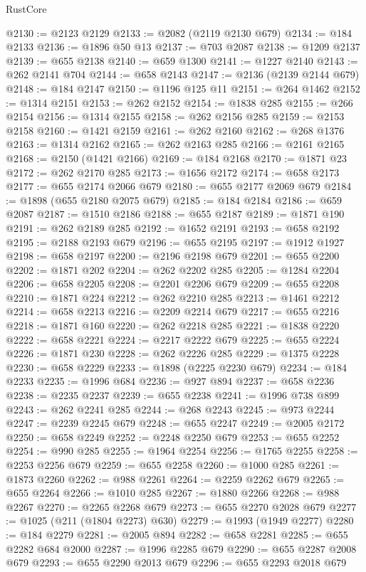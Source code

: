 \begin{lexlean}{RustCore}
\begin{coremodule}
@2130 := @2123 @2129
@2133 := @2082 (@2119 @2130 @679)
@2134 := @184 @2133
@2136 := @1896 @50 @13
@2137 := @703 @2087
@2138 := @1209 @2137
@2139 := @655 @2138
@2140 := @659 @1300
@2141 := @1227 @2140
@2143 := @262 @2141 @704
@2144 := @658 @2143
@2147 := @2136 (@2139 @2144 @679)
@2148 := @184 @2147
@2150 := @1196 @125 @11
@2151 := @264 @1462
@2152 := @1314 @2151
@2153 := @262 @2152
@2154 := @1838 @285
@2155 := @266 @2154
@2156 := @1314 @2155
@2158 := @262 @2156 @285
@2159 := @2153 @2158
@2160 := @1421 @2159
@2161 := @262 @2160
@2162 := @268 @1376
@2163 := @1314 @2162
@2165 := @262 @2163 @285
@2166 := @2161 @2165
@2168 := @2150 (@1421 @2166)
@2169 := @184 @2168
@2170 := @1871 @23
@2172 := @262 @2170 @285
@2173 := @1656 @2172
@2174 := @658 @2173
@2177 := @655 @2174 @2066 @679
@2180 := @655 @2177 @2069 @679
@2184 := @1898 (@655 @2180 @2075 @679)
@2185 := @184 @2184
@2186 := @659 @2087
@2187 := @1510 @2186
@2188 := @655 @2187
@2189 := @1871 @190
@2191 := @262 @2189 @285
@2192 := @1652 @2191
@2193 := @658 @2192
@2195 := @2188 @2193 @679
@2196 := @655 @2195
@2197 := @1912 @1927
@2198 := @658 @2197
@2200 := @2196 @2198 @679
@2201 := @655 @2200
@2202 := @1871 @202
@2204 := @262 @2202 @285
@2205 := @1284 @2204
@2206 := @658 @2205
@2208 := @2201 @2206 @679
@2209 := @655 @2208
@2210 := @1871 @224
@2212 := @262 @2210 @285
@2213 := @1461 @2212
@2214 := @658 @2213
@2216 := @2209 @2214 @679
@2217 := @655 @2216
@2218 := @1871 @160
@2220 := @262 @2218 @285
@2221 := @1838 @2220
@2222 := @658 @2221
@2224 := @2217 @2222 @679
@2225 := @655 @2224
@2226 := @1871 @230
@2228 := @262 @2226 @285
@2229 := @1375 @2228
@2230 := @658 @2229
@2233 := @1898 (@2225 @2230 @679)
@2234 := @184 @2233
@2235 := @1996 @684
@2236 := @927 @894
@2237 := @658 @2236
@2238 := @2235 @2237
@2239 := @655 @2238
@2241 := @1996 @738 @899
@2243 := @262 @2241 @285
@2244 := @268 @2243
@2245 := @973 @2244
@2247 := @2239 @2245 @679
@2248 := @655 @2247
@2249 := @2005 @2172
@2250 := @658 @2249
@2252 := @2248 @2250 @679
@2253 := @655 @2252
@2254 := @990 @285
@2255 := @1964 @2254
@2256 := @1765 @2255
@2258 := @2253 @2256 @679
@2259 := @655 @2258
@2260 := @1000 @285
@2261 := @1873 @2260
@2262 := @988 @2261
@2264 := @2259 @2262 @679
@2265 := @655 @2264
@2266 := @1010 @285
@2267 := @1880 @2266
@2268 := @988 @2267
@2270 := @2265 @2268 @679
@2273 := @655 @2270 @2028 @679
@2277 := @1025 (@211 (@1804 @2273) @630)
@2279 := @1993 (@1949 @2277)
@2280 := @184 @2279
@2281 := @2005 @894
@2282 := @658 @2281
@2285 := @655 @2282 @684 @2000
@2287 := @1996 @2285 @679
@2290 := @655 @2287 @2008 @679
@2293 := @655 @2290 @2013 @679
@2296 := @655 @2293 @2018 @679

\end{coremodule}
\end{lexlean}
